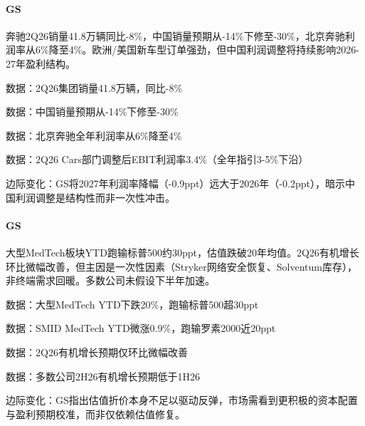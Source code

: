 \documentclass[11pt]{ctexart}
\begin{document}
\paragraph{GS} 奔驰2Q26销量41.8万辆同比-8\%，中国销量预期从-14\%下修至-30\%，北京奔驰利润率从6\%降至4\%。欧洲/美国新车型订单强劲，但中国利润调整将持续影响2026-27年盈利结构。
{\small\color{refgray}数据：2Q26集团销量41.8万辆，同比-8\%\par}
{\small\color{refgray}数据：中国销量预期从-14\%下修至-30\%\par}
{\small\color{refgray}数据：北京奔驰全年利润率从6\%降至4\%\par}
{\small\color{refgray}数据：2Q26 Cars部门调整后EBIT利润率3.4\%（全年指引3-5\%下沿）\par}
{\small\color{refgray}边际变化：GS将2027年利润率降幅（-0.9ppt）远大于2026年（-0.2ppt），暗示中国利润调整是结构性而非一次性冲击。\par}
\paragraph{GS} 大型MedTech板块YTD跑输标普500约30ppt，估值跌破20年均值。2Q26有机增长环比微幅改善，但主因是一次性因素（Stryker网络安全恢复、Solventum库存），非终端需求回暖。多数公司未假设下半年加速。
{\small\color{refgray}数据：大型MedTech YTD下跌20\%，跑输标普500超30ppt\par}
{\small\color{refgray}数据：SMID MedTech YTD微涨0.9\%，跑输罗素2000近20ppt\par}
{\small\color{refgray}数据：2Q26有机增长预期仅环比微幅改善\par}
{\small\color{refgray}数据：多数公司2H26有机增长预期低于1H26\par}
{\small\color{refgray}边际变化：GS指出估值折价本身不足以驱动反弹，市场需看到更积极的资本配置与盈利预期校准，而非仅依赖估值修复。\par}
\end{document}
